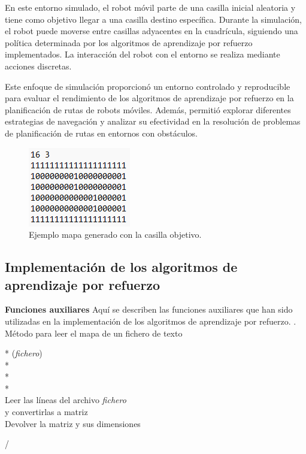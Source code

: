 \documentclass[conference,a4paper]{IEEEtran}
\begin{document}
En este entorno simulado, el robot móvil parte de una casilla inicial aleatoria y tiene como objetivo llegar a una casilla destino específica. Durante la simulación, el robot puede moverse entre casillas adyacentes en la cuadrícula, siguiendo una política determinada por los algoritmos de aprendizaje por refuerzo implementados. La interacción del robot con el entorno se realiza mediante acciones discretas.\newline

Este enfoque de simulación proporcionó un entorno controlado y reproducible para evaluar el rendimiento de los algoritmos de aprendizaje por refuerzo en la planificación de rutas de robots móviles. Además, permitió explorar diferentes estrategias de navegación y analizar su efectividad en la resolución de problemas de planificación de rutas en entornos con obstáculos.\newline

\begin{figure}[h]
  \centering
  \includegraphics{Ejemplo_mapa.png}
  \caption{Ejemplo mapa generado con la casilla objetivo.}
  \label{fig:Ejemplo_mapa}
\end{figure}

\subsection{Implementación de los algoritmos de aprendizaje por refuerzo}

\textbf{Funciones auxiliares\newline}
Aquí se describen las funciones auxiliares que han sido utilizadas en la implementación de los algoritmos de aprendizaje por refuerzo.\newline
\newline\newline\newline{}. Método para leer el mapa de un fichero de texto
  \begin{pseudo}*
    (\textit{fichero}) \\*
     \\*
     \\*
    \\
    Leer las líneas del archivo \textit{fichero}\\
    y convertirlas a matriz\\
    Devolver la matriz y sus dimensiones
  \end{pseudo}/
\end{document}
